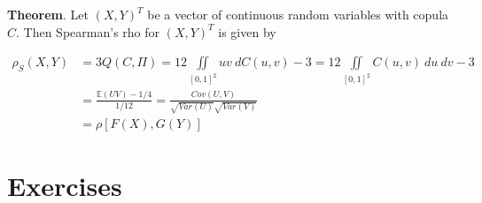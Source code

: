 \documentclass{article}
\begin{document}

\noindent\textbf{Theorem}.  Let $(X, Y)^T$ be a vector of continuous random variables with copula $C$. Then Spearman's rho for $(X, Y)^T$ is given by

\begin{align}
\rho_S (X, Y) & = 3Q(C, \Pi) = 12 \iint\limits_{[0, 1]^2} uv \> dC(u, v) - 3 = 12 \iint\limits_{[0, 1]^2} C(u,v) \>du\>dv - 3 \\
& = \frac{\mathbb{E}(UV) - 1/4}{1/12} = \frac{Cov(U, V)}{\sqrt{Var(U)}\sqrt{Var(V)}} \\
& = \rho[F(X), G(Y)]
\end{align}

%
%
\section{Exercises}
\end{document}
